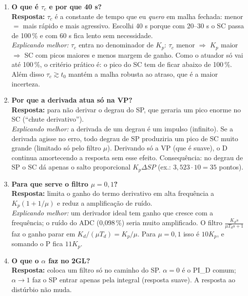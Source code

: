 \documentclass[11pt,a4paper]{article}
\begin{document}
\begin{enumerate}[leftmargin=*]
\emph{Explicando melhor:} a ideia é cancelar a dinâmica da planta com o controlador: o termo $(\tau s+1)$ do numerador de $C$ cancela o polo da planta, e o resultado em malha fechada fica sendo só o que eu escolhi. Não dá para cancelar o atraso (o controlador não pode prever o futuro), por isso a resposta desejada mantém $e^{-t_0s}$. O PID resultante é de forma série; convertemos para a forma paralela do OpenPLC.
\item \textbf{O que é $\tau_c$ e por que 40 s?}\\
\textbf{Resposta:} $\tau_c$ é a constante de tempo que eu \emph{quero} em malha fechada: menor $=$ mais rápido e mais agressivo. Escolhi 40 s porque com 20--30 s o SC passa de 100\,\% e com 60 s fica lento sem necessidade.\\
\emph{Explicando melhor:} $\tau_c$ entra no denominador de $K_p$: $\tau_c$ menor $\Rightarrow$ $K_p$ maior $\Rightarrow$ SC com picos maiores e menos margem de ganho. Como o atuador só vai até 100\,\%, o critério prático é: o pico do SC tem de ficar abaixo de 100\,\%. Além disso $\tau_c\gtrsim t_0$ mantém a malha robusta ao atraso, que é a maior incerteza.
\item \textbf{Por que a derivada atua só na VP?}\\
\textbf{Resposta:} para não derivar o degrau do SP, que geraria um pico enorme no SC (``chute derivativo'').\\
\emph{Explicando melhor:} a derivada de um degrau é um impulso (infinito). Se a derivada agisse no erro, todo degrau de SP produziria um pico de SC muito grande (limitado só pelo filtro $\mu$). Derivando só a VP (que é suave), o D continua amortecendo a resposta sem esse efeito. Consequência: no degrau de SP o SC dá apenas o salto proporcional $K_p\Delta SP$ (ex.: $3{,}523\cdot10=35$ pontos).
\item \textbf{Para que serve o filtro $\mu=0{,}1$?}\\
\textbf{Resposta:} limita o ganho do termo derivativo em alta frequência a $K_p(1+1/\mu)$ e reduz a amplificação de ruído.\\
\emph{Explicando melhor:} um derivador ideal tem ganho que cresce com a frequência; o ruído do ADC (0,098\,\%) seria muito amplificado. O filtro $\frac{K_ds}{\mu T_ds+1}$ faz o ganho parar em $K_d/(\mu T_d)=K_p/\mu$. Para $\mu=0{,}1$ isso é $10K_p$, e somando o P fica $11K_p$.
\item \textbf{O que o $\alpha$ faz no 2GL?}\\
\textbf{Resposta:} coloca um filtro só no caminho do SP. $\alpha=0$ é o PI\_D comum; $\alpha\to1$ faz o SP entrar apenas pela integral (resposta suave). A resposta ao distúrbio não muda.\\

\end{enumerate}
\end{document}
